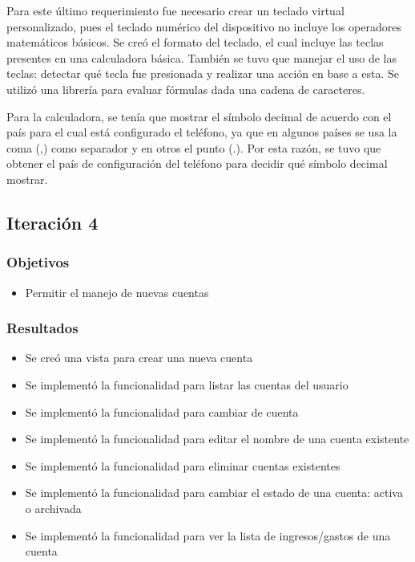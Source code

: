 Para este último requerimiento fue necesario crear un teclado virtual personalizado, pues el teclado numérico del dispositivo no incluye los operadores matemáticos básicos. Se creó el formato del teclado, el cual incluye las teclas presentes en una calculadora básica. También se tuvo que manejar el uso de las teclas: detectar qué tecla fue presionada y realizar una acción en base a esta. Se utilizó una librería para evaluar fórmulas dada una cadena de caracteres.

Para la calculadora, se tenía que mostrar el símbolo decimal de acuerdo con el país para el cual está configurado el teléfono, ya que en algunos países se usa la coma (,) como separador y en otros el punto (.). Por esta razón, se tuvo que obtener el país de configuración del teléfono para decidir qué símbolo decimal mostrar.

\subsection{Iteración 4}
\subsubsection{Objetivos}
\begin{itemize}
\item Permitir el manejo de nuevas cuentas
\end{itemize}

\subsubsection{Resultados}
\begin{itemize}

\item Se creó una vista para crear una nueva cuenta
\item Se implementó la funcionalidad para listar las cuentas del usuario 
\item Se implementó la funcionalidad para cambiar de cuenta
\item Se implementó la funcionalidad para editar el nombre de una cuenta existente
\item Se implementó la funcionalidad para eliminar cuentas existentes
\item Se implementó la funcionalidad para cambiar el estado de una cuenta: activa o archivada
\item Se implementó la funcionalidad para ver la lista de ingresos/gastos de una cuenta

\end{itemize}

